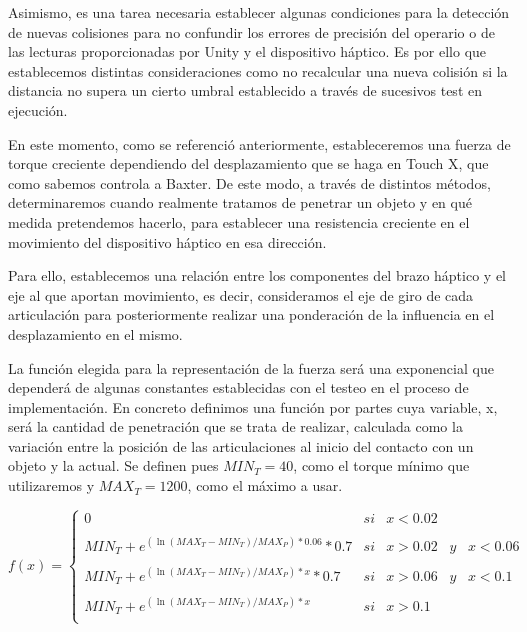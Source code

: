 Asimismo, es una tarea necesaria establecer algunas condiciones para la detección de nuevas colisiones para no confundir los errores de precisión del operario o de las lecturas proporcionadas por Unity y el dispositivo háptico. Es por ello que establecemos distintas consideraciones como no recalcular una nueva colisión si la distancia no supera un cierto umbral establecido a través de sucesivos test en ejecución.

En este momento, como se referenció anteriormente, estableceremos una fuerza de torque creciente dependiendo del desplazamiento que se haga en Touch X, que como sabemos controla a Baxter. De este modo, a través de distintos métodos, determinaremos cuando realmente tratamos de penetrar un objeto y en qué medida pretendemos hacerlo, para establecer una resistencia creciente en el movimiento del dispositivo háptico en esa dirección.

Para ello, establecemos una relación entre los componentes del brazo háptico y el eje al que aportan movimiento, es decir, consideramos el eje de giro de cada articulación para posteriormente realizar una ponderación de la influencia en el desplazamiento en el mismo.

La función elegida para la representación de la fuerza será una exponencial que dependerá de algunas constantes establecidas con el testeo en el proceso de implementación. En concreto definimos una función por partes cuya variable, x, será la cantidad de penetración que se trata de realizar, calculada como la variación entre la posición de las articulaciones al inicio del contacto con un objeto y la actual. Se definen pues $MIN_T = 40$, como el torque mínimo    que utilizaremos y $MAX_T = 1200$, como el máximo a usar.


$$
    f(x)= \left\{ \begin{array}{lcc}
             0 & si  & x < 0.02 \\
            \\ MIN_T + e^{(\ln(MAX_T-MIN_T)/MAX_P)*0.06}*0.7 & si & x > 0.02  \hspace{10pt} y \hspace{10pt} x < 0.06 \\
            \\ MIN_T + e^{(\ln(MAX_T-MIN_T)/MAX_P)*x}*0.7 & si & x > 0.06 \hspace{10pt} y \hspace{10pt} x < 0.1 \\
             \\ MIN_T + e^{(\ln(MAX_T-MIN_T)/MAX_P)*x} & si & x > 0.1\\
             \end{array}
   \right.
$$

